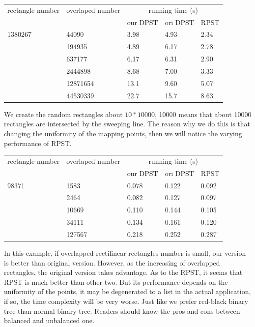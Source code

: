 \documentclass{acm_proc_article-sp}
\begin{document}
\begin{table}[ht]
\begin{tabular}{|p{1.2cm}|p{1.2cm}|p{1.1cm}|p{1.1cm}|p{1.1cm}|}
\hline rectangle number & overlaped number & \multicolumn{3}{|c|}{running time (s)}\\
\cline{3-5}
    && our DPST & ori DPST & RPST\\
\hline 1380267 & 44090  & 3.98 & 4.93 & 2.34\\
\cline{2-5}      & 194935 & 4.89 & 6.17  & 2.78\\
\cline{2-5}      & 637177 & 6.17 & 6.31  & 2.90\\
\cline{2-5}      & 2444898 & 8.68 & 7.00  & 3.33\\
\cline{2-5}      & 12871654 & 13.1 & 9.60  & 5.07\\
\cline{2-5}      & 44530339 & 22.7 & 15.7  & 8.63\\
\hline
\end{tabular}
\end{table}

We create the random rectangles about $10*10000$, 10000 means that about 10000 rectangles are intersected by the sweeping line. The reason why we do this is that changing the uniformity of the mapping points, then we will notice the varying performance of RPST.\\



\begin{table}[ht]
\begin{tabular}{|p{1.2cm}|p{1.2cm}|p{1.1cm}|p{1.1cm}|p{1.1cm}|}
\hline rectangle number & overlaped number & \multicolumn{3}{|c|}{running time (s)}\\
\cline{3-5}
    && our DPST & ori DPST & RPST\\
\hline 98371 & 1583  & 0.078 & 0.122 & 0.092\\
\cline{2-5}      & 2464 & 0.082 & 0.127  & 0.097\\
\cline{2-5}      & 10669 & 0.110 & 0.144  & 0.105\\
\cline{2-5}      & 34111 & 0.134 & 0.161  & 0.120\\
\cline{2-5}      & 127567 & 0.218 & 0.252  & 0.287\\
\hline
\end{tabular}
\end{table}

In this example, if overlapped rectilinear rectangles number is small, our version is better than original version. However, as the increasing of overlapped rectangles, the original version takes advantage. As to the RPST, it seems that RPST is much better than other two. 
But its performance depends on the uniformity of the points, it may be degenerated to a list in the actual application, if so, the time complexity will be very worse. Just like we prefer red-black binary tree than normal binary tree. Readers should know the pros and cons between balanced and unbalanced one.
\end{document}
